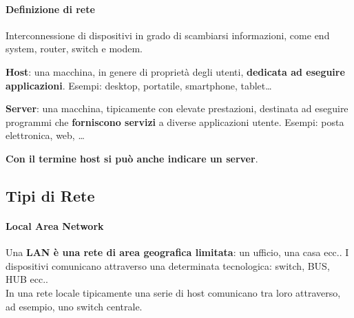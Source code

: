 \documentclass[10pt]{article}
\begin{document}
\paragraph{Definizione di rete} Interconnessione di dispositivi in grado di scambiarsi informazioni, come end system, router, switch e modem.\\
\begin{list}{}{Gli end system possono essere di due tipi:}
\item \textbf{Host}: una macchina, in genere di proprietà degli utenti, \textbf{dedicata ad eseguire applicazioni}. Esempi: desktop, portatile, smartphone, tablet\ldots
\item \textbf{Server}: una macchina, tipicamente con elevate prestazioni, destinata ad eseguire programmi che \textbf{forniscono servizi} a diverse applicazioni utente. Esempi: posta elettronica, web, \ldots
\end{list}
\textbf{Con il termine host si può anche indicare un server}.

\subsection{Tipi di Rete}
\paragraph{Local Area Network} Una \textbf{LAN è una rete di area geografica limitata}: un ufficio, una casa ecc.. I dispositivi comunicano attraverso una determinata tecnologica: switch, BUS, HUB ecc..\\
In una rete locale tipicamente una serie di host comunicano tra loro attraverso, ad esempio, uno switch centrale.
\end{document}
